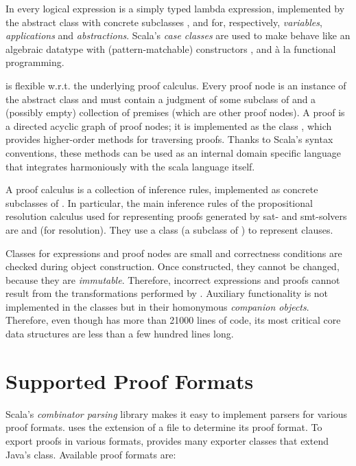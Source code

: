 \documentclass{llncs}
\begin{document}
In {\skeptik} every logical expression is a simply typed lambda expression, implemented by the abstract class  with concrete subclasses ,  and  for, respectively, \emph{variables}, \emph{applications} and \emph{abstractions}. Scala's \emph{case classes} are used to make  behave like an algebraic datatype with (pattern-matchable) constructors ,  and  \`{a} la functional programming.

{\skeptik} is flexible w.r.t. the underlying proof calculus. Every proof node is an instance of the abstract class  and must contain a judgment of some subclass  of  and a (possibly empty) collection of premises (which are other proof nodes). A proof is a directed acyclic graph of proof nodes; it is implemented as the class , which provides higher-order methods for traversing proofs. Thanks to Scala's syntax conventions, these methods can be used as an internal domain specific language that integrates harmoniously with the scala language itself.

A proof calculus is a collection of inference rules, implemented as concrete subclasses of . In particular, the main inference rules of the propositional resolution calculus used for representing proofs generated by sat- and smt-solvers are  and  (for resolution). They use a  class (a subclass of ) to represent clauses.

Classes for expressions and proof nodes are small and correctness conditions are checked during object construction. Once constructed, they cannot be changed, because they are \emph{immutable}. Therefore, incorrect expressions and proofs cannot result from the transformations performed by {\skeptik}. Auxiliary functionality is not implemented in the classes but in their homonymous \emph{companion objects}. Therefore, even though {\skeptik} has more than 21000 lines of code, its most critical core data structures are less than a few hundred lines long.


\section{Supported Proof Formats}
\label{sec:ProofFormats}

Scala's \emph{combinator parsing} library makes it easy to implement parsers for various proof formats. {\skeptik} uses the extension of a file to  determine its proof format. To export proofs in various formats, {\skeptik} provides many exporter classes that extend Java's  class. Available proof formats are:
\end{document}
